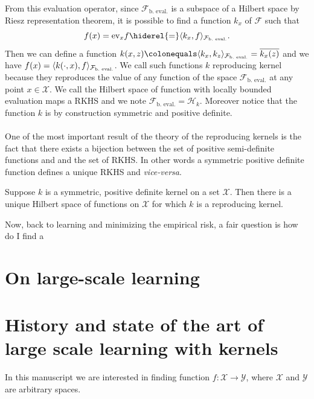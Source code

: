 From this evaluation operator, since $\mathcal{F}_{\text{b.~eval.}}$ is a
subspace of a Hilbert space by Riesz representation theorem, it is possible to
find a function $k_x$ of $\mathcal{F}$ such that
\begin{dmath*}
    f(x) = \text{ev}_x f \hiderel{=} \inner{k_x, f}_{\mathcal{F}_{\text{b.~eval.}}}.
\end{dmath*}
Then we can define a function $k(x, z) \colonequals \inner{k_x,
k_z}_{\mathcal{F}_{\text{b.~eval.}}}=\conj{k_x(z)}$ and we have $f(x) =
\langle k(\cdot, x), f\rangle_{\mathcal{F}_{\text{b.~eval.}}}$. We call such functions
$k$ reproducing kernel because they reproduces the value of any function of the
space $\mathcal{F}_{\text{b.~eval.}}$ at any point $x\in\mathcal{X}$. We call
the Hilbert space of function with locally bounded evaluation maps a \acf{RKHS}
and we note $\mathcal{F}_{\text{b.~eval.}} =\mathcal{H}_k$. Moreover notice
that the function $k$ is by construction symmetric and positive definite.
\paragraph{}
One of the most important result of the theory of the reproducing kernels is
the fact that there exists a bijection between the set of positive
semi-definite functions and and the set of \acl{RKHS}. In other words a
symmetric positive definite function defines a unique \acs{RKHS} and
\emph{vice-versa}.
\begin{theorem}
    Suppose $k$ is a symmetric, positive definite kernel on a set
    $\mathcal{X}$. Then there is a unique Hilbert space of functions on
    $\mathcal{X}$ for which $k$ is a reproducing kernel.
\end{theorem}
Now, back to learning and minimizing the empirical risk, a fair question is
how do I find a

\section{On large-scale learning}
\label{sec:on_large-scale_learning}

\section{History and state of the art of large scale learning with kernels}
\label{sec:history}


In this manuscript we are interested in finding function
$f:\mathcal{X}\to\mathcal{Y}$, where $\mathcal{X}$ and $\mathcal{Y}$ are
arbitrary spaces.

